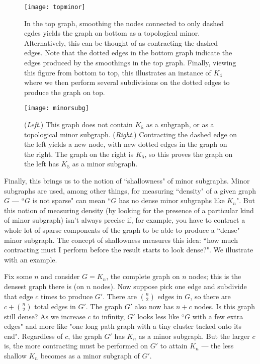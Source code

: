 \begin{figure}[h!]
  \centering
  \texttt{[image: topminor]}
  \caption{ In the top graph, smoothing the nodes connected to only dashed egdes yields the graph on bottom as a topological minor. Alternatively, this can be thought of as contracting the dashed edges.
  Note that the dotted edges in the bottom graph indicate the edges produced by the smoothings in the top graph. Finally, viewing this figure from bottom to top, this illustrates an instance of $K_4$ where we then perform several subdivisions on the dotted edges to produce the graph on top.\label{fig:topminor}}
\end{figure}

\begin{figure}[h!]
  \centering
  \texttt{[image: minorsubg]}
  \caption{ (\emph{Left}.) This graph does not contain $K_5$ as a subgraph, or as a topological minor subgraph. (\emph{Right}.) Contracting the dashed edge on the left yields a new node, with new dotted edges in the graph on the right. The graph on the right is $K_5$, so this proves the graph on the left has $K_5$ as a minor subgraph.\label{fig:minorsubg}}
\end{figure}

Finally, this brings us to the notion of ``shallowness" of minor subgraphs. Minor subgraphs are used, among other things, for measuring ``density" of a given graph $G$ --- ``$G$ is not sparse" can mean ``$G$ has no dense minor subgraphs like $K_n$". But this notion of measuring density (by looking for the presence of a particular kind of minor subgraph) isn't always precise if, for example, you have to contract a whole lot of sparse components of the graph to be able to produce a ``dense" minor subgraph. The concept of shallowness measures this idea: ``how much contracting must I perform before the result starts to look dense?". We illustrate with an example.

Fix some $n$ and consider $G = K_n$, the complete graph on $n$ nodes; this is the densest graph there is (on $n$ nodes). Now suppose pick one edge and subdivide that edge $c$ times to produce $G'$. There are $\binom{n}{2}$ edges in $G$, so there are $c + \binom{n}{2}$ total edges in $G'$. The graph $G'$ also now has $n+c$ nodes. Is this graph still dense? As we increase $c$ to infinity, $G'$ looks less like ``$G$ with a few extra edges" and more like "one long path graph with a tiny cluster tacked onto its end". Regardless of $c$, the graph $G'$ has $K_n$ as a minor subgraph. But the larger $c$ is, the more contracting must be performed on $G'$ to attain $K_n$ --- the less shallow $K_n$ becomes as a minor subgraph of $G'$.




